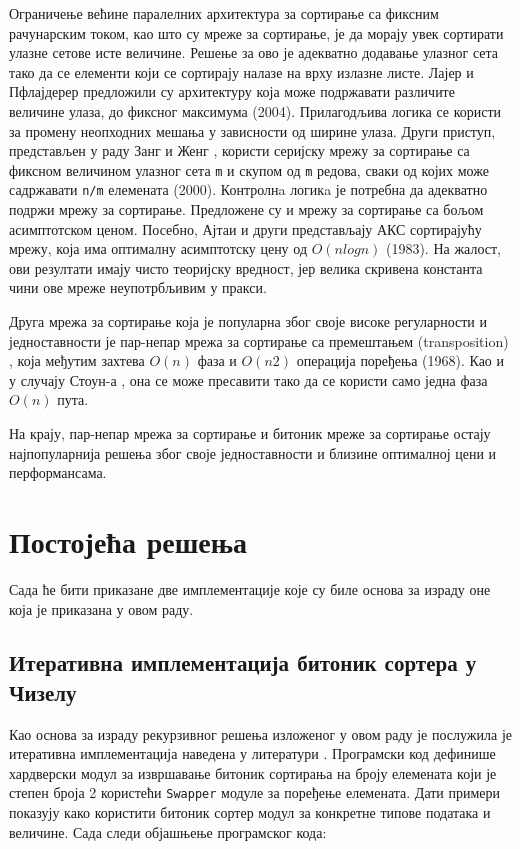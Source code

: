 \documentclass[12pt, a4paper]{article}
\theoremstyle{definition}
\begin{document}
Ограничење већине паралелних архитектура за сортирање са фиксним рачунарским током, као што су мреже за сортирање, је да морају увек сортирати улазне сетове исте величине. Решење за ово је адекватно додавање улазног сета тако да се елементи који се сортирају налазе на врху излазне листе. Лајер и Пфлајдерер \cite{layer04} предложили су архитектуру која може подржавати различите величине улаза, до фиксног максимума (2004). Прилагодљива логика се користи за промену неопходних мешања у зависности од ширине улаза. Други приступ, представљен у раду Занг и Женг \cite{zang}, користи серијску мрежу за сортирање са фиксном величином улазног сета \verb+m+ и скупом од \verb+m+ редова, сваки од којих може садржавати \verb+n/m+ елемената (2000). Контролнa логикa је потребна да адекватно подржи мрежу за сортирање.
Предложене су и мрежу за сортирање са бољом асимптотском ценом. Посебно, Ајтаи и други \cite{aitan} представљају АКС сортирајућу мрежу, која има оптималну асимптотску цену од $O(nlog n)$ (1983). На жалост, ови резултати имају чисто теоријску вредност, јер велика скривена константа чини ове мреже неупотрбљивим у пракси.

Друга мрежа за сортирање која је популарна због своје високе регуларности и једноставности је пар-непар мрежа за сортирање са премештањем (transposition) \cite{knuth}, која међутим захтева $O(n)$ фаза и $O(n2)$ операција поређења (1968). Као и у случају Стоун-а \cite{stone}, она се може пресавити тако да се користи само једна фаза $O(n)$ пута.

На крају, пар-непар мрежа за сортирање и битоник мреже за сортирање остају најпопуларнија решења због своје једноставности и близине оптималној цени и перформансама.

\newpage

\section{Постојећа решења}

Сада ће бити приказане две имплементације које су биле основа за израду оне која је приказана у овом раду.

\subsection{Итеративна имплементација битоник сортера у Чизелу}
Као основа за израду рекурзивног решења изложеног у овом раду је послужила је итеративна имплементација наведена у литератури \cite{git_freeChipsBitonic}.
Програмски код дефинише хардверски модул за извршавање битоник сортирања на броју елемената који је степен броја 2 користећи \verb+Swapper+ модуле за поређење елемената. Дати примери показују како користити битоник сортер модул за конкретне типове података и величине. Сада следи објашњење програмског кода:
\end{document}
